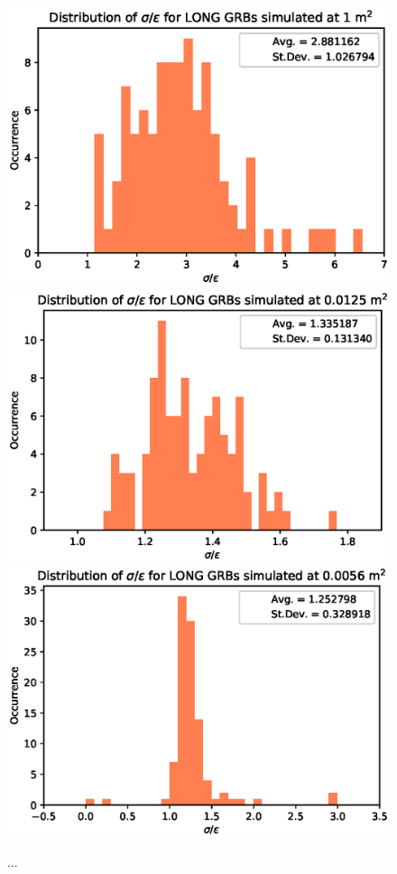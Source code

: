 \documentclass[]{spie}  %
\begin{document}
\begin{figure}[h!]
\includegraphics[scale=0.5,angle=0]{fig/LONG/ratio_distrib_1.eps}\\
\includegraphics[scale=0.5,angle=0]{fig/LONG/ratio_distrib_0.0125.eps}
\includegraphics[scale=0.5,angle=0]{fig/LONG/ratio_distrib_0.0056.eps}\\

\caption{...}
\label{fig:ratio_distribution_Long}
\end{figure}
\end{document}
